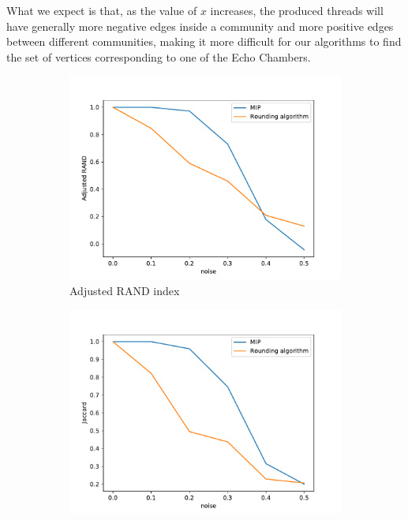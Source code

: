 What we expect is that, as the value of $x$ increases, the produced threads
will have generally more negative edges inside a community and more positive
edges between different communities, making it more difficult for our
algorithms to find the set of vertices corresponding to one of the Echo
Chambers.

\begin{figure}
	\begin{center}
		\begin{subfigure}[b]{0.8\textwidth}
			\centering
			\includegraphics[width=\textwidth]{tex/out/synthetic/noise_adj_rand.pdf}
			\caption{Adjusted RAND index}
			\label{fig:tex/out/synthetic_exact/model2_noise_adj_rand.pdf}
		\end{subfigure}
		\quad
		\begin{subfigure}[b]{0.8\textwidth}
			\centering
			\includegraphics[width=\textwidth]{tex/out/synthetic/noise_jaccard.pdf}

\end{subfigure}
\end{center}
\end{figure}

